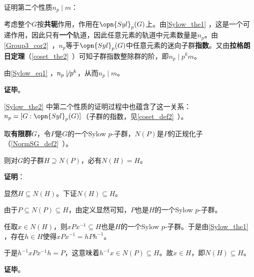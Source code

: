 证明第二个性质$n_p\mid m$：

考虑整个$G$按\textbf{共轭}作用，作用在$\opn{Syl}_p(G)$上。由\autoref{Sylow_the1} ，这是一个可递作用，因此只有\textbf{一个}轨道，因此任意元素的轨道中元素数量是$n_p$。由\autoref{Group3_cor2}~，$n_p$等于$\opn{Syl}_p(G)$中任意元素的迷向子群\textbf{指数}。又由\textbf{拉格朗日定理}（\autoref{coset_the2}~）可知子群指数整除群的阶，即$n_p\mid p^km$。

由\autoref{Sylow_eq1} ，$n_p\not \mid p^k$，从而$n_p\mid m$。


\textbf{证毕}。

\autoref{Sylow_the2} 中第二个性质的证明过程中也蕴含了这一关系：$n_p=[G:\opn{Syl}_p(G)]$（子群的指数，见\autoref{coset_def2}~）。


\begin{theorem}{}
取\textbf{有限群}$G$，令$P$是$G$的一个Sylow $p$-子群，$N(P)$是$P$的正规化子（\autoref{NormSG_def2}~）。

则对$G$的子群$H\supseteq N(P)$，必有$N(H)=H$。
\end{theorem}

\textbf{证明}：

显然$H\subseteq N(H)$。下证$N(H)\subseteq H$。

由于$P\subseteq N(P)\subseteq H$，由定义显然可知，$P$也是$H$的一个Sylow $p$-子群。

任取$x\in N(H)$，则$xPx^{-1}\subseteq H$也是$H$的一个Sylow $p$-子群。于是由\autoref{Sylow_the1} ，存在$h\in H$使得$xPx^{-1}=hPh^{-1}$。

于是$h^{-1}xPx^{-1}h=P$，这意味着$h^{-1}x\in N(P)\subseteq H$。故$x\in H$，即$N(H)\subseteq H$。

\textbf{证毕}。














